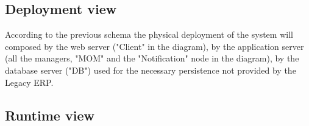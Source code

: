 \documentclass{article}
\begin{document}
		
		\subsection{Deployment view}		
		\begin{minipage}{\linewidth}
				\vspace{5mm} %
		\end{minipage}
		According to the previous schema the physical deployment of the system will composed by the web server ("Client" in the diagram), by the application server (all the managers, "MOM" and the "Notification" node in the diagram), by the database server ("DB") used for the necessary persistence not provided by the Legacy ERP.
		\pagebreak
		\subsection{Runtime view}
\end{document}
